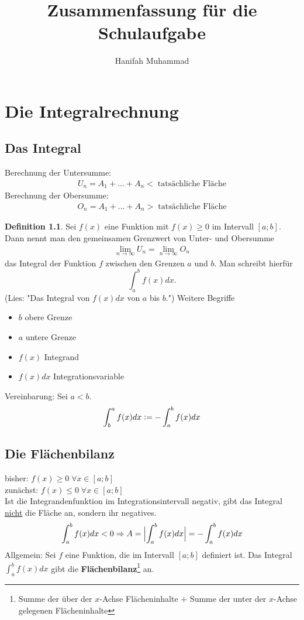 \documentclass[a4paper,12pt,pointlessnumbers]{scrreprt}
\theoremstyle{definition}
\newtheorem{definition}{Definition}[section]
\begin{document}
\title{Zusammenfassung für die Schulaufgabe}
\author{Hanifah Muhammad}

\tableofcontents
\chapter{Die Integralrechnung}
\section{Das Integral}
Berechnung der Untersumme:
\begin{align*}
U_n=A_1+...+A_n <\; \text{tatsächliche Fläche}
\end{align*}
Berechnung der Obersumme:
\begin{align*}
O_n=A_1+...+A_n >\; \text{tatsächliche Fläche}
\end{align*}
\begin{definition}
Sei $f(x)$ eine Funktion mit $f(x)\geq 0$ im Intervall $[a;b]$. Dann nennt man den gemeinsamen Grenzwert von Unter- und Obersumme 
\begin{align*}
\lim\limits_{n \to \infty} U_n = \lim\limits_{n \to \infty} O_n 
\end{align*}
das Integral der Funktion $f$ zwischen den Grenzen $a$ und $b$.
Man schreibt hierfür \[\int_a^bf(x)dx\text{.}\]
(Lies: "Das Integral von $f(x) dx$ von $a$ bis $b$.")
Weitere Begriffe
\begin{itemize}
\item $b$ obere Grenze
\item $a$ untere Grenze
\item $f(x)$ Integrand
\item $f(x)dx$ Integrationsvariable 
\end{itemize}
Vereinbarung: Sei $a<b$.
\begin{align*}
\int_b^a f(x) dx \vcentcolon= - \int_a^b f(x) dx
\end{align*}
\end{definition}
\newpage
\section{Die Flächenbilanz}
bisher: $f(x) \geq 0 \;\forall x \in [a;b]$
\\ zunächst: $f(x) \leq 0 \;\forall x \in [a;b]$
\\ Ist die Integrandenfunktion im Integrationsintervall negativ, gibt das Integral \underline{nicht} die Fläche an, sondern ihr negatives.
\[\int_a^b f(x) dx < 0 \Rightarrow A = \Bigl|\int_a^b f(x) dx\Bigr| = - \int_a^b f(x) dx 
\]
Allgemein: Sei $f$ eine Funktion, die im Intervall $[a;b]$ definiert ist. Das Integral $\int_a^b f(x) dx$ gibt die \textbf{Flächenbilanz}\footnote{Summe der über der $x$-Achse Flächeninhalte $+$ Summe der unter der $x$-Achse gelegenen Flächeninhalte} an.
\end{document}
